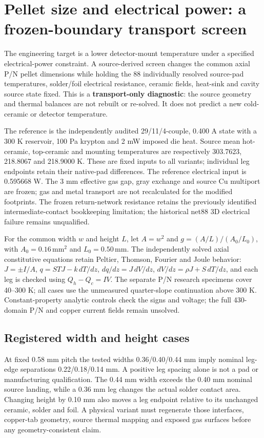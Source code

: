 \clearpage
\section{Pellet size and electrical power: a frozen-boundary transport screen}
The engineering target is a lower detector-mount temperature under a specified electrical-power constraint. A source-derived screen changes the common axial P/N pellet dimensions while holding the 88 individually resolved source-pad temperatures, solder/foil electrical resistance, ceramic fields, heat-sink and cavity source state fixed. This is a \textbf{transport-only diagnostic}: the source geometry and thermal balances are not rebuilt or re-solved. It does not predict a new cold-ceramic or detector temperature.

The reference is the independently audited 29/11/4-couple, 0.400 A state with a 300 K reservoir, 100 Pa krypton and 2 mW imposed die heat. Source mean hot-ceramic, top-ceramic and mounting temperatures are respectively 303.7623, 218.8067 and 218.9000 K. These are fixed inputs to all variants; individual leg endpoints retain their native-pad differences. The reference electrical input is 0.595668 W. The 3 mm effective gas gap, gray exchange and source Cu multiport are frozen; gas and metal transport are not recalculated for the modified footprints. The frozen return-network resistance retains the previously identified intermediate-contact bookkeeping limitation; the historical net88 3D electrical failure remains unqualified.

For the common width $w$ and height $L$, let $A=w^2$ and $g=(A/L)/(A_0/L_0)$, with $A_0=0.16\,\mathrm{mm}^2$ and $L_0=0.50\,\mathrm{mm}$. The independently solved axial constitutive equations retain Peltier, Thomson, Fourier and Joule behavior: $J=\pm I/A$, $q=STJ-k\,dT/dz$, $dq/dz=J\,dV/dz$, $dV/dz=\rho J+S\,dT/dz$, and each leg is checked using $Q_h-Q_c=IV$. The separate P/N research specimens cover 40--300 K; all cases use the unmeasured quarter-slope continuation above 300 K. Constant-property analytic controls check the signs and voltage; the full 430-domain P/N and copper current fields remain unsolved.

\subsection{Registered width and height cases}
At fixed 0.58 mm pitch the tested widths 0.36/0.40/0.44 mm imply nominal leg-edge separations 0.22/0.18/0.14 mm. A positive leg spacing alone is not a pad or manufacturing qualification. The 0.44 mm width exceeds the 0.40 mm nominal source landing, while a 0.36 mm leg changes the actual solder contact area. Changing height by 0.10 mm also moves a leg endpoint relative to its unchanged ceramic, solder and foil. A physical variant must regenerate those interfaces, copper-tab geometry, source thermal mapping and exposed gas surfaces before any geometry-consistent claim.

